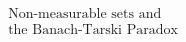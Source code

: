 \documentclass[preview]{standalone}
\begin{document}
\begin{align*}
\text{Non-measurable sets and} \\ \text{the Banach-Tarski Paradox}
\end{align*}
\end{document}
